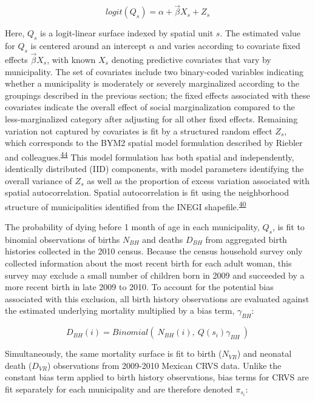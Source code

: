 \documentclass[
]{article}
\begin{document}
\[logit(Q_s) = \alpha + \overrightarrow{\beta}X_s + Z_s\]

Here, \(Q_s\) is a logit-linear surface indexed by spatial unit \(s\). The estimated value for \(Q_s\) is centered around an intercept \(\alpha\) and varies according to covariate fixed effects \(\overrightarrow{\beta}X_s\), with known \(X_s\) denoting predictive covariates that vary by municipality. The set of covariates include two binary-coded variables indicating whether a municipality is moderately or severely marginalized according to the groupings described in the previous section; the fixed effects associated with these covariates indicate the overall effect of social marginalization compared to the less-marginalized category after adjusting for all other fixed effects. Remaining variation not captured by covariates is fit by a structured random effect \(Z_s\), which corresponds to the BYM2 spatial model formulation described by Riebler and colleagues.\textsuperscript{\protect\hyperlink{ref-Riebler2016}{44}} This model formulation has both spatial and independently, identically distributed (IID) components, with model parameters identifying the overall variance of \(Z_s\) as well as the proportion of excess variation associated with spatial autocorrelation. Spatial autocorrelation is fit using the neighborhood structure of municipalities identified from the INEGI shapefile.\textsuperscript{\protect\hyperlink{ref-INEGI2010b}{40}}

The probability of dying before 1 month of age in each municipality, \(Q_s\), is fit to binomial observations of births \(N_{BH}\) and deaths \(D_{BH}\) from aggregated birth histories collected in the 2010 census. Because the census household survey only collected information about the most recent birth for each adult woman, this survey may exclude a small number of children born in 2009 and succeeded by a more recent birth in late 2009 to 2010. To account for the potential bias associated with this exclusion, all birth history observations are evaluated against the estimated underlying mortality multiplied by a bias term, \(\gamma_{BH}\):

\[ D_{BH}(i) = Binomial(~N_{BH}(i),~Q(s_i)\gamma_{BH}~)\]

Simultaneously, the same mortality surface is fit to birth (\(N_{VR}\)) and neonatal death (\(D_{VR}\)) observations from 2009-2010 Mexican CRVS data. Unlike the constant bias term applied to birth history observations, bias terms for CRVS are fit separately for each municipality and are therefore denoted \(\pi_{s_i}\):
\end{document}
